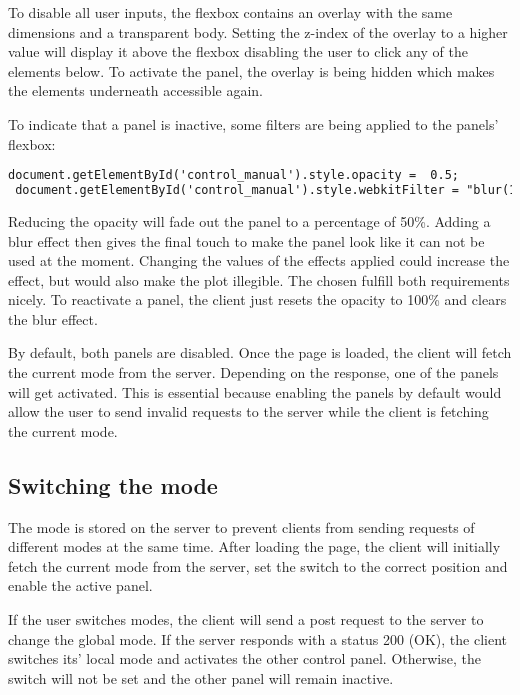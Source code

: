 To disable all user inputs, the flexbox contains an overlay with the same dimensions and a transparent body. Setting the z-index of the overlay to a higher value will display it above the flexbox disabling the user to click any of the elements below.  To activate the panel, the overlay is being hidden which makes the elements underneath accessible again.

\newpage
To indicate that a panel is inactive, some filters are being applied to the panels' flexbox:

\begin{lstlisting}[language = HTML, numbers = none]
 document.getElementById('control_manual').style.opacity =  0.5;
 document.getElementById('control_manual').style.webkitFilter = "blur(1px)";
\end{lstlisting}

Reducing the opacity will fade out the panel to a percentage of 50\%. Adding a blur effect then gives the final touch to make the panel look like it can not be used at the moment. Changing the values of the effects applied could increase the effect, but would also make the plot illegible. The chosen fulfill both requirements nicely. To reactivate a panel, the client just resets the opacity to 100\% and clears the blur effect.

By default, both panels are disabled. Once the page is loaded, the client will fetch the current mode from the server. Depending on the response, one of the panels will get activated. This is essential because enabling the panels by default would allow the user to send invalid requests to the server while the client is fetching the current mode. 



\subsection{Switching the mode}
\label{subsec:switching_the_mode}

The mode is stored on the server to prevent clients from sending requests of different modes at the same time.  After loading the page, the client will initially fetch the current mode from the server, set the switch to the correct position and enable the active panel.

If the user switches modes, the client will send a post request to the server to change the global mode. If the server responds with a status 200 (OK), the client switches its' local mode and activates the other control panel. Otherwise, the switch will not be set and the other panel will remain inactive.

